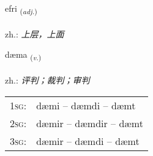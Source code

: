 \documentclass[frontgrid, backgrid]{flacards}\usepackage[]{graphicx}\usepackage[]{xcolor}
\begin{document}
\renewcommand{\flhead}{\vskip5pt \fboxsep=0pt {\small\bfseries\footnotesize Lýsingarorð | 形容词}}
\renewcommand{\fcfoot}{\vskip5pt \fboxsep=0pt \hspace{2pt}{\small\bfseries\footnotesize 1K}}

\renewcommand{\blhead}{\vskip5pt {\small\bfseries\footnotesize Lýsingarorð | 形容词 }}
\renewcommand{\bcfoot}{\vskip5pt \hspace{2pt}{\small\bfseries\footnotesize 1K}}


{efri \small{\textsubscript{(\textit{adj.})}} \\[1ex] %
\textphonetic{[ɛvrɪ]} \\
zh.: \emph{上层，上面} \\  [2ex]
\renewcommand*{\arraystretch}{0.8}
}

\renewcommand{\flhead}{\vskip5pt \fboxsep=0pt {\small\bfseries\footnotesize Sagnorð | 动词}}
\renewcommand{\fcfoot}{\vskip5pt \fboxsep=0pt \hspace{2pt}{\small\bfseries\footnotesize 1K}}

\renewcommand{\blhead}{\vskip5pt {\small\bfseries\footnotesize Sagnorð | 动词 }}
\renewcommand{\bcfoot}{\vskip5pt \hspace{2pt}{\small\bfseries\footnotesize 1K}}


{dæma \small{\textsubscript{(\textit{v.})}} \\[1ex] %
\textphonetic{[taiːma]} \\
zh.: \emph{评判；裁判；审判} \\  [2ex]
\renewcommand*{\arraystretch}{0.8}
\begin{tabular}{p{1cm}l}
\textsc{1sg}: & dæmi -- dæmdi -- dæmt \\ 
\textsc{2sg}: & dæmir -- dæmdir -- dæmt \\ 
\textsc{3sg}: & dæmir -- dæmdi -- dæmt \\ 
\end{tabular}
}
\end{document}
